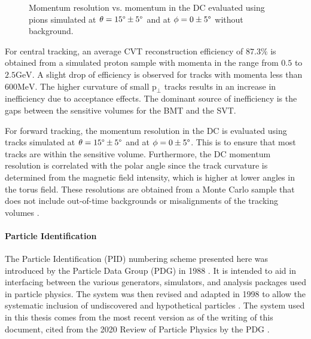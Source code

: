     \begin{figure}
        \centering{}
        \caption[DC momentum resolution vs momentum.]{Momentum resolution vs. momentum in the DC evaluated using pions simulated at $\theta = 15\degree \pm 5\degree$ and at $\phi = 0 \pm 5\degree$ without background.}
        \label{fig::dc_pres}
    \end{figure}

    For central tracking, an average CVT reconstruction efficiency of $87.3\%$ is obtained from a simulated proton sample with momenta in the range from $0.5$ to $2.5 \text{GeV}$.
    A slight drop of efficiency is observed for tracks with momenta less than $600 \text{MeV}$.
    The higher curvature of small $\text{p}_\perp$ tracks results in an increase in inefficiency due to acceptance effects.
    The dominant source of inefficiency is the gaps between the sensitive volumes for the BMT and the SVT.

    For forward tracking, the momentum resolution in the DC is evaluated using tracks simulated at $\theta = 15\degree \pm 5\degree$ and at $\phi = 0 \pm 5\degree$.
    This is to ensure that most tracks are within the sensitive volume.
    Furthermore, the DC momentum resolution is correlated with the polar angle since the track curvature is determined from the magnetic field intensity, which is higher at lower angles in the torus field.
    These resolutions are obtained from a Monte Carlo sample that does not include out-of-time backgrounds or misalignments of the tracking volumes \cite{ziegler2020}.

\paragraph{Particle Identification}
    The Particle Identification (PID) numbering scheme presented here was introduced by the Particle Data Group (PDG) in 1988 \cite{yost1988}.
    It is intended to aid in interfacing between the various generators, simulators, and analysis packages used in particle physics.
    The system was then revised and adapted in 1998 to allow the systematic inclusion of undiscovered and hypothetical particles \cite{particle1998}.
    The system used in this thesis comes from the most recent version as of the writing of this document, cited from the 2020 Review of Particle Physics by the PDG \cite{particle2020review}.

